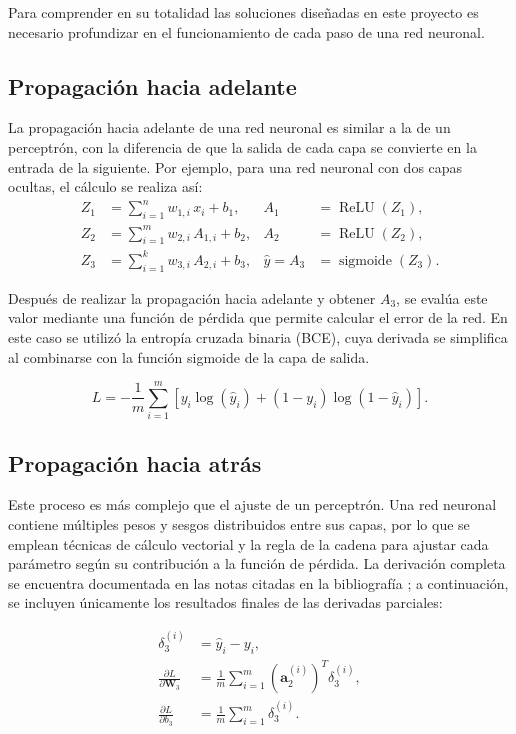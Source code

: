 \documentclass[12pt,letterpaper,oneside]{article}
\begin{document}
Para comprender en su totalidad las soluciones diseñadas en este proyecto es necesario profundizar en el funcionamiento de cada paso de una red neuronal.

\subsection{Propagación hacia adelante}
La propagación hacia adelante de una red neuronal es similar a la de un perceptrón, con la diferencia de que la salida de cada capa se convierte en la entrada de la siguiente. Por ejemplo, para una red neuronal con dos capas ocultas, el cálculo se realiza así:
\[
\begin{aligned}
    Z_1 &= \sum_{i=1}^{n} w_{1,i} \, x_i + b_1,
    & A_1 &= \operatorname{ReLU}(Z_1), \\[0.4em]
    Z_2 &= \sum_{i=1}^{m} w_{2,i} \, A_{1,i} + b_2,
    & A_2 &= \operatorname{ReLU}(Z_2), \\[0.4em]
    Z_3 &= \sum_{i=1}^{k} w_{3,i} \, A_{2,i} + b_3,
    & \hat{y} = A_3 &= \operatorname{sigmoide}(Z_3).
\end{aligned}
\]

Después de realizar la propagación hacia adelante y obtener $A_3$, se evalúa este valor mediante una función de pérdida que permite calcular el error de la red. En este caso se utilizó la entropía cruzada binaria (BCE), cuya derivada se simplifica al combinarse con la función sigmoide de la capa de salida.

\[
L = -\frac{1}{m} \sum_{i=1}^{m}
\left[y_i \log(\hat{y}_i) + (1-y_i)\log(1-\hat{y}_i)\right].
\]

\subsection{Propagación hacia atrás}

Este proceso es más complejo que el ajuste de un perceptrón. Una red neuronal contiene múltiples pesos y sesgos distribuidos entre sus capas, por lo que se emplean técnicas de cálculo vectorial y la regla de la cadena para ajustar cada parámetro según su contribución a la función de pérdida. La derivación completa se encuentra documentada en las notas citadas en la bibliografía \cite{backprop-notes}; a continuación, se incluyen únicamente los resultados finales de las derivadas parciales:

\[
\begin{aligned}
\delta_3^{(i)} &= \hat{y}_i - y_i, \\[0.4em]
\frac{\partial L}{\partial \mathbf{W}_3}
    &= \frac{1}{m} \sum_{i=1}^{m}
       \left(\mathbf{a}_2^{(i)}\right)^T \delta_3^{(i)}, \\
\frac{\partial L}{\partial b_3}
    &= \frac{1}{m} \sum_{i=1}^{m} \delta_3^{(i)}.
\end{aligned}
\]
\end{document}
